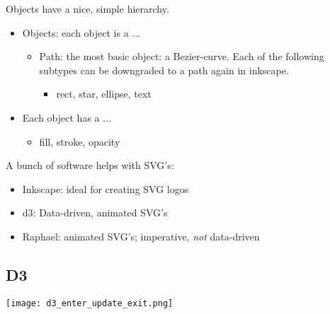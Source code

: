 Objects have a nice, simple hierarchy.
\begin{itemize}
    \item Objects: each object is a ...
        \begin{itemize}
            \item Path: the most basic object: a Bezier-curve. Each of the following subtypes can be downgraded to a path again in inkscape.
                \begin{itemize}
                    \item rect, star, ellipse, text
                \end{itemize}
        \end{itemize}
    \item Each object has a ... 
        \begin{itemize}
            \item fill, stroke, opacity
        \end{itemize}
\end{itemize}

A bunch of software helps with SVG's:
\begin{itemize}
    \item Inkscape: ideal for creating SVG logos
    \item d3: Data-driven, animated SVG's
    \item Raphael: animated SVG's; imperative, \emph{not} data-driven
\end{itemize}


\subsection{D3}

\texttt{[image: d3\_enter\_update\_exit.png]}


